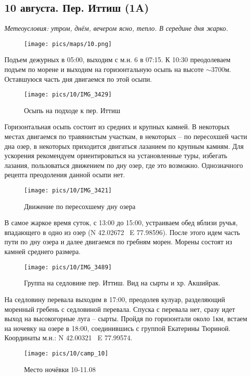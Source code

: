 \subsection{10 августа. Пер. Иттиш (1A)}
\textit{Метеоусловия: утром, днём, вечером ясно, тепло. В середине дня жарко.}

\begin{figure}[h!]
	\centering
		\texttt{[image: pics/maps/10.png]}
	\label{fig:mini_10}
\end{figure}

Подъем дежурных в 05:00, выходим с м.н. 6 в 07:15. К 10:30 преодолеваем подъем по морене и выходим на горизонтальную осыпь на высоте $\sim$3700м. Оставшуюся часть дня двигаемся по этой осыпи.

\begin{figure}[h!]
	\centering
	\texttt{[image: pics/10/IMG\_3429]}
	\caption{Осыпь на подходе к пер. Иттиш}
	\label{fig:IMG_3429}
\end{figure}

Горизонтальная осыпь состоит из средних и крупных камней. В некоторых местах двигаемся по травянистым участкам, в некоторых -- по пересохшей части дна озер, в некоторых приходится двигаться лазанием по крупным камням. Для ускорения рекомендуем ориентироваться на установленные туры, избегать лазания, пользоваться движением по дну озер, где это возможно. Однозначного рецепта преодоления данной осыпи нет.

\begin{figure}[h!]
	\centering
	\texttt{[image: pics/10/IMG\_3421]}
	\caption{Движение по пересохшему дну озера}
	\label{fig:IMG_3421}
\end{figure}

В самое жаркое время суток, с 13:00 до 15:00, устраиваем обед вблизи ручья, впадающего в одно из озер (N 42.02672\degree~ E 77.98596\degree). После этого идем часть пути по дну озера и далее двигаемся по гребням морен. Морены состоят из камней среднего размера.

\begin{figure}[h!]
	\centering
	\texttt{[image: pics/10/IMG\_3489]}
	\caption{Группа на седловине пер. Иттиш. Вид на сырты и хр. Акшийрак.}
	\label{fig:IMG_3489}
\end{figure}

На седловину перевала выходим в 17:00, преодолев кулуар, разделяющий моренный гребень с седловиной перевала. Спуска с перевала нет, сразу идет выход на высокогорные луга -- сырты. Пройдя по горизонтали около 1км, встаем на ночевку на озере в 18:00, соединившись с группой Екатерины Тюриной. Координаты м.н.: N 42.00321\degree~ E 77.99574\degree.

\begin{figure}[h!]
	\centering
		\texttt{[image: pics/10/camp\_10]}
	\caption{Место ночёвки 10-11.08}
	\label{fig:camp_10}
\end{figure}

\clearpage